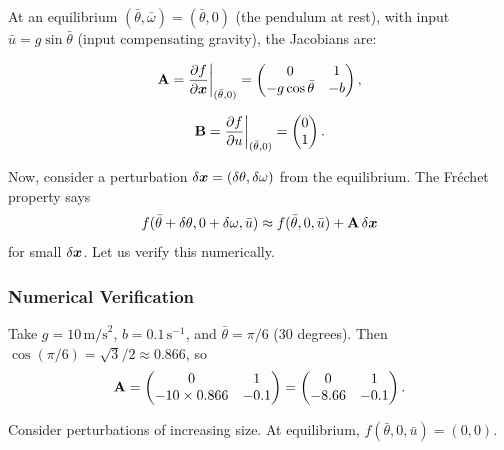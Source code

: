At an equilibrium $(\bar\theta, \bar\omega) = (\bar\theta, 0)$ (the pendulum at rest), with
input $\bar{u} = g\sin\bar\theta$ (input compensating gravity), the Jacobians are:

\begin{equation}
\mathbf{A} = \frac{\partial f}{\partial \bm{x}}\bigg|_{(\bar\theta, 0)} = \begin{pmatrix} 0 & 1 \\ -g\cos\bar\theta & -b \end{pmatrix},
\label{eq:ch1:pendulum-A}
\end{equation}

\begin{equation}
\mathbf{B} = \frac{\partial f}{\partial u}\bigg|_{(\bar\theta, 0)} = \begin{pmatrix} 0 \\ 1 \end{pmatrix}.
\label{eq:ch1:pendulum-B}
\end{equation}

Now, consider a perturbation $\delta\bm{x} = (\delta\theta, \delta\omega)$ from the equilibrium.
The Fréchet property says
\begin{equation}
f(\bar\theta + \delta\theta, 0 + \delta\omega, \bar{u}) \approx f(\bar\theta, 0, \bar{u}) + \mathbf{A}\,\delta\bm{x}
\end{equation}
for small $\delta\bm{x}$. Let us verify this numerically.

\subsubsection{Numerical Verification}

Take $g = 10 \, \text{m/s}^2$, $b = 0.1 \, \text{s}^{-1}$, and $\bar\theta = \pi/6$ (30 degrees).
Then $\cos(\pi/6) = \sqrt{3}/2 \approx 0.866$, so
\begin{equation}
\mathbf{A} = \begin{pmatrix} 0 & 1 \\ -10 \times 0.866 & -0.1 \end{pmatrix} = \begin{pmatrix} 0 & 1 \\ -8.66 & -0.1 \end{pmatrix}.
\end{equation}

Consider perturbations of increasing size. At equilibrium, $f(\bar\theta, 0, \bar{u}) = (0, 0)$.

